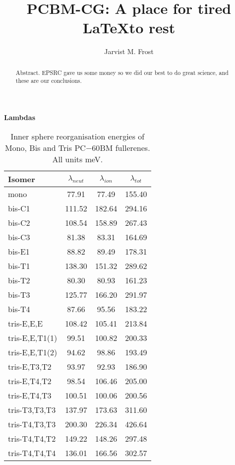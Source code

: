 \documentclass[journal=jacsat,manuscript=communication]{achemso}
\title{PCBM-CG: A place for tired \LaTeX to rest}
\author{Jarvist M. Frost}
\affiliation{Centre for Sustainable Chemical Technologies and Department of Chemistry, University of Bath, Claverton Down, Bath BA2 7AY, UK}
\begin{document}
\begin{abstract}
Abstract. EPSRC gave us some money so we did our best to do great science, and these are our conclusions. 
\end{abstract}



\textbf{Lambdas}

\begin{table}
\centering
\begin{tabular}{lSSS}
\toprule
Isomer & $\lambda_{neut}$ & $\lambda_{ion}$ & $\lambda_{tot}$ \\
\midrule
mono & 77.91 & 77.49 & 155.40 \\
\midrule
bis-C1 & 111.52 & 182.64 & 294.16 \\
bis-C2 & 108.54 & 158.89 & 267.43 \\
bis-C3 & 81.38 & 83.31 & 164.69 \\
bis-E1 & 88.82 & 89.49 & 178.31 \\
bis-T1 & 138.30 & 151.32 & 289.62 \\
bis-T2 & 80.30 & 80.93 & 161.23 \\
bis-T3 & 125.77 & 166.20 & 291.97 \\
bis-T4 & 87.66 & 95.56 & 183.22 \\
\midrule
tris-E,E,E & 108.42 & 105.41 & 213.84 \\
tris-E,E,T1(1) & 99.51 & 100.82 & 200.33 \\
tris-E,E,T1(2) & 94.62 & 98.86 & 193.49 \\
tris-E,T3,T2 & 93.97 & 92.93 & 186.90 \\
tris-E,T4,T2 & 98.54 & 106.46 & 205.00 \\
tris-E,T4,T3 & 100.51 & 100.06 & 200.56 \\
tris-T3,T3,T3 & 137.97 & 173.63 & 311.60 \\
tris-T4,T3,T3 & 200.30 & 226.34 & 426.64 \\
tris-T4,T4,T2 & 149.22 & 148.26 & 297.48 \\
tris-T4,T4,T4 & 136.01 & 166.56 & 302.57 \\
\bottomrule
\end{tabular}
\caption{\label{tab:Lambda}
Inner sphere reorganisation energies of Mono, Bis and Tris PC$-{60}$BM fullerenes. All units meV.}
\end{table}
\end{document}
